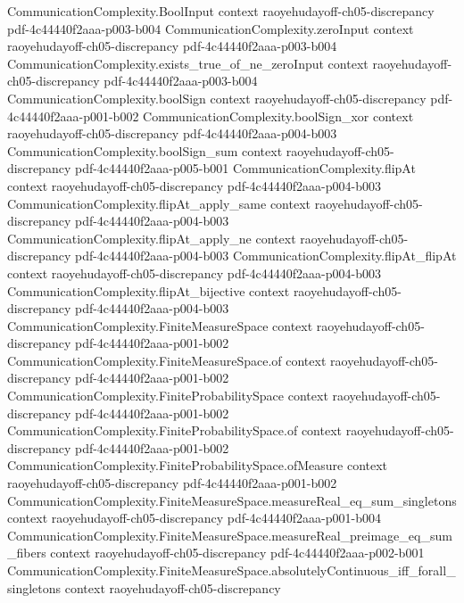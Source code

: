 \begin{lemma}
  {CommunicationComplexity.BoolInput}
  {context}
  {raoyehudayoff-ch05-discrepancy}
  {pdf-4c44440f2aaa-p003-b004}
\proofstep
  {CommunicationComplexity.zeroInput}
  {context}
  {raoyehudayoff-ch05-discrepancy}
  {pdf-4c44440f2aaa-p003-b004}
\proofstep
  {CommunicationComplexity.exists_true_of_ne_zeroInput}
  {context}
  {raoyehudayoff-ch05-discrepancy}
  {pdf-4c44440f2aaa-p003-b004}
\proofstep
  {CommunicationComplexity.boolSign}
  {context}
  {raoyehudayoff-ch05-discrepancy}
  {pdf-4c44440f2aaa-p001-b002}
\proofstep
  {CommunicationComplexity.boolSign_xor}
  {context}
  {raoyehudayoff-ch05-discrepancy}
  {pdf-4c44440f2aaa-p004-b003}
\proofstep
  {CommunicationComplexity.boolSign_sum}
  {context}
  {raoyehudayoff-ch05-discrepancy}
  {pdf-4c44440f2aaa-p005-b001}
\proofstep
  {CommunicationComplexity.flipAt}
  {context}
  {raoyehudayoff-ch05-discrepancy}
  {pdf-4c44440f2aaa-p004-b003}
\proofstep
  {CommunicationComplexity.flipAt_apply_same}
  {context}
  {raoyehudayoff-ch05-discrepancy}
  {pdf-4c44440f2aaa-p004-b003}
\proofstep
  {CommunicationComplexity.flipAt_apply_ne}
  {context}
  {raoyehudayoff-ch05-discrepancy}
  {pdf-4c44440f2aaa-p004-b003}
\proofstep
  {CommunicationComplexity.flipAt_flipAt}
  {context}
  {raoyehudayoff-ch05-discrepancy}
  {pdf-4c44440f2aaa-p004-b003}
\proofstep
  {CommunicationComplexity.flipAt_bijective}
  {context}
  {raoyehudayoff-ch05-discrepancy}
  {pdf-4c44440f2aaa-p004-b003}
\proofstep
  {CommunicationComplexity.FiniteMeasureSpace}
  {context}
  {raoyehudayoff-ch05-discrepancy}
  {pdf-4c44440f2aaa-p001-b002}
\proofstep
  {CommunicationComplexity.FiniteMeasureSpace.of}
  {context}
  {raoyehudayoff-ch05-discrepancy}
  {pdf-4c44440f2aaa-p001-b002}
\proofstep
  {CommunicationComplexity.FiniteProbabilitySpace}
  {context}
  {raoyehudayoff-ch05-discrepancy}
  {pdf-4c44440f2aaa-p001-b002}
\proofstep
  {CommunicationComplexity.FiniteProbabilitySpace.of}
  {context}
  {raoyehudayoff-ch05-discrepancy}
  {pdf-4c44440f2aaa-p001-b002}
\proofstep
  {CommunicationComplexity.FiniteProbabilitySpace.ofMeasure}
  {context}
  {raoyehudayoff-ch05-discrepancy}
  {pdf-4c44440f2aaa-p001-b002}
\proofstep
  {CommunicationComplexity.FiniteMeasureSpace.measureReal_eq_sum_singletons}
  {context}
  {raoyehudayoff-ch05-discrepancy}
  {pdf-4c44440f2aaa-p001-b004}
\proofstep
  {CommunicationComplexity.FiniteMeasureSpace.measureReal_preimage_eq_sum_fibers}
  {context}
  {raoyehudayoff-ch05-discrepancy}
  {pdf-4c44440f2aaa-p002-b001}
\proofstep
  {CommunicationComplexity.FiniteMeasureSpace.absolutelyContinuous_iff_forall_singletons}
  {context}
  {raoyehudayoff-ch05-discrepancy}

\end{lemma}
